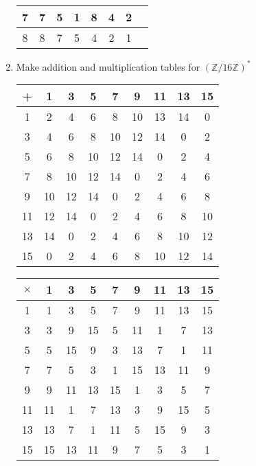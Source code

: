 \documentclass[a4paper, 11pt]{article}
\begin{document}
\begin{enumerate}[label=(\alph*)]
\begin{tabular}{ |c|c|c|c|c|c|c|c| }
                \hline
                    7 & 7 & 5 & 1 & 8 & 4 & 2\\ 
                \hline
                    8 & 8 & 7 & 5 & 4 & 2 & 1\\ 
                \hline
            \end{tabular}
        \item Make addition and multiplication tables for $(\mathbb{Z}/16\mathbb{Z})^*$\\
            \begin{tabular}{ |c|c|c|c|c|c|c|c|c| } 
                \hline
                    + & 1 & 3 & 5 & 7 & 9 & 11 & 13 & 15\\ 
                \hline
                    1 & 2 & 4 & 6 & 8 & 10 & 13 & 14 & 0\\ 
                \hline
                    3 & 4 & 6 & 8 & 10 & 12 & 14 & 0 & 2\\ 
                \hline
                    5 & 6 & 8 & 10 & 12 & 14 & 0 & 2 & 4\\ 
                \hline
                    7 & 8 & 10 & 12 & 14 & 0 & 2 & 4 & 6\\ 
                \hline
                    9 & 10 & 12 & 14 & 0 & 2 & 4 & 6 & 8\\ 
                \hline
                    11 & 12 & 14 & 0 & 2 & 4 & 6 & 8 &10\\ 
                \hline
                    13 & 14 & 0 & 2 & 4 & 6 & 8 & 10 & 12\\ 
                \hline
                    15 & 0 & 2 & 4 & 6 & 8 & 10 & 12 & 14\\ 
                \hline
            \end{tabular}
            \quad
            \begin{tabular}{ |c|c|c|c|c|c|c|c|c| } 
                \hline
                    $\times$ & 1 & 3 & 5 & 7 & 9 & 11 & 13 & 15\\ 
                \hline
                    1 & 1 & 3 & 5 & 7 & 9 & 11 & 13 & 15\\ 
                \hline
                    3 & 3 & 9 & 15 & 5 & 11 & 1 & 7 & 13\\ 
                \hline
                    5 & 5 & 15 & 9 & 3 & 13 & 7 & 1 & 11\\ 
                \hline
                    7 & 7 & 5 & 3 & 1 & 15 & 13 & 11 & 9\\ 
                \hline
                    9 & 9 & 11 & 13 & 15 & 1 & 3 & 5 & 7\\ 
                \hline
                    11 & 11 & 1 & 7 & 13 & 3 & 9 & 15 & 5\\ 
                \hline
                    13 & 13 & 7 & 1 & 11 & 5 & 15 & 9 & 3\\ 
                \hline
                    15 & 15 & 13 & 11 & 9 & 7 & 5 & 3 & 1\\ 
                \hline
            \end{tabular}
    \end{enumerate}
\end{document}
